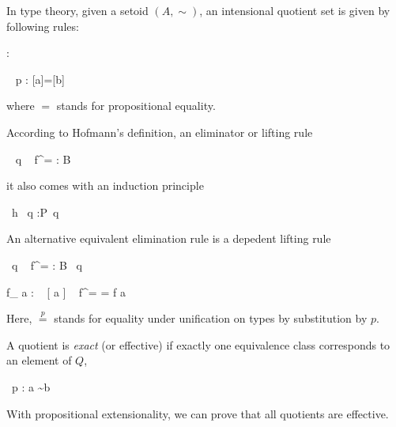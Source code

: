 In type theory, given a setoid $(A,\sim)$, an intensional quotient set is given by
following rules:

{ : \Set}


\begin{multicols}{2}
\columnbreak
{}
{ ~ p : [a]=[b]}
\end{multicols}

where $=$ stands for propositional equality.

According to Hofmann's\cite{hof:95:sm} definition, an eliminator or lifting rule


{ ~ q ~ f^{=} : B}



it also comes with an induction principle

{ ~h ~q :P~q}

An alternative equivalent elimination rule is a depedent lifting rule

{ ~q ~ f^= : B~ q}

{f_{\beta} a  :  ~ [ a ] ~ f^= = f a }

Here, $\stackrel{p}{=}$ stands for equality under unification on types by substitution by $p$.

A quotient is \emph{exact} (or effective) if exactly one equivalence class corresponds to
an element of $Q$,

{~{p} : a \sim b}


With propositional extensionality, we can prove that all quotients are effective.

